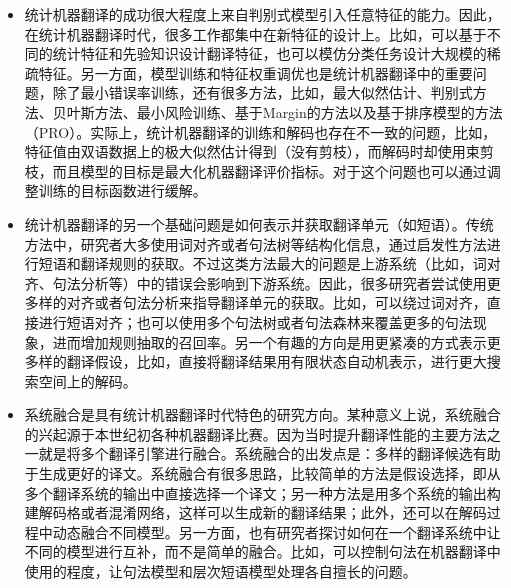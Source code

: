 \begin{itemize}
\vspace{0.5em}
\item 统计机器翻译的成功很大程度上来自判别式模型引入任意特征的能力。因此，在统计机器翻译时代，很多工作都集中在新特征的设计上。比如，可以基于不同的统计特征和先验知识设计翻译特征\cite{och2004smorgasbord,Chiang200911,gildea2003loosely}，也可以模仿分类任务设计大规模的稀疏特征\cite{chiang2008online}。另一方面，模型训练和特征权重调优也是统计机器翻译中的重要问题，除了最小错误率训练，还有很多方法，比如，最大似然估计\cite{koehn2003statistical,Peter1993The}、判别式方法\cite{Blunsom2008A}、贝叶斯方法\cite{Blunsom2009A,Cohn2009A}、最小风险训练\cite{smith2006minimum,li2009first-}、基于Margin的方法\cite{watanabe2007online,Chiang200911}以及基于排序模型的方法（PRO）\cite{Hopkins2011Tuning,dreyer2015apro}。实际上，统计机器翻译的训练和解码也存在不一致的问题，比如，特征值由双语数据上的极大似然估计得到（没有剪枝），而解码时却使用束剪枝，而且模型的目标是最大化机器翻译评价指标。对于这个问题也可以通过调整训练的目标函数进行缓解\cite{XiaoA,marcu2006practical}。
\vspace{0.5em}
\item 统计机器翻译的另一个基础问题是如何表示并获取翻译单元（如短语）。传统方法中，研究者大多使用词对齐或者句法树等结构化信息，通过启发性方法进行短语和翻译规则的获取。不过这类方法最大的问题是上游系统（比如，词对齐、句法分析等）中的错误会影响到下游系统。因此，很多研究者尝试使用更多样的对齐或者句法分析来指导翻译单元的获取。比如，可以绕过词对齐，直接进行短语对齐\cite{denero2010phrase}；也可以使用多个句法树或者句法森林来覆盖更多的句法现象，进而增加规则抽取的召回率\cite{mi2008forest,xiao2010empirical}。另一个有趣的方向是用更紧凑的方式表示更多样的翻译假设，比如，直接将翻译结果用有限状态自动机表示，进行更大搜索空间上的解码\cite{de2010hierarchical,Casacuberta2004Machine}。
\vspace{0.5em}
\item 系统融合是具有统计机器翻译时代特色的研究方向。某种意义上说，系统融合的兴起源于本世纪初各种机器翻译比赛。因为当时提升翻译性能的主要方法之一就是将多个翻译引擎进行融合。系统融合的出发点是：多样的翻译候选有助于生成更好的译文。系统融合有很多思路，比较简单的方法是假设选择，即从多个翻译系统的输出中直接选择一个译文\cite{bangalore2001computing,rosti2007combining,xiao2013bagging}；另一种方法是用多个系统的输出构建解码格或者混淆网络，这样可以生成新的翻译结果\cite{Yang2009Lattice,He2008Indirect,Li2009Incremental}；此外，还可以在解码过程中动态融合不同模型\cite{Yang2009Joint,Mu2009Collaborative}。另一方面，也有研究者探讨如何在一个翻译系统中让不同的模型进行互补，而不是简单的融合。比如，可以控制句法在机器翻译中使用的程度，让句法模型和层次短语模型处理各自擅长的问题\cite{Tong2016Syntactic}。

\end{itemize}
